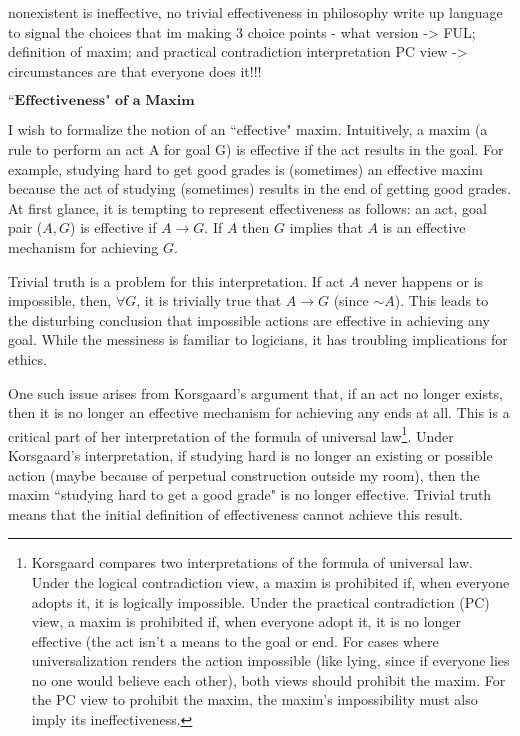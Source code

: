 \begin{isabellebody}
{nonexistent is ineffective, no trivial effectiveness in philosophy
write up language to signal the choices that im making
3 choice points - what version -> FUL; definition of maxim; and practical contradiction interpretation
PC view -> circumstances are that everyone does it!!!%
}%
\pagebreak
%
\begin{isamarkuptext}%
$\textbf{``Effectiveness" of a Maxim}$%
\end{isamarkuptext}\isamarkuptrue%
%
\begin{isamarkuptext}%
I wish to formalize the notion of an ``effective" maxim. Intuitively, a maxim (a rule to 
perform an act A for goal G) is effective if the act results in the goal. For example, studying hard 
to get good grades is (sometimes) an effective maxim because the act of studying (sometimes) results in
 the end of getting good grades. At first glance, it is tempting to represent effectiveness 
as follows: an act, goal pair ($A, G$) is effective if $A \longrightarrow G$. If $A$ then $G$ implies that 
$A$ is an effective mechanism for achieving $G$.

Trivial truth is a problem for this interpretation. If act $A$ never happens or 
is impossible, then, $\forall G$, it is trivially true that $A \longrightarrow G$ (since $\sim A$). This leads to the 
disturbing conclusion that impossible actions are effective in achieving any goal. While the messiness 
is familiar to logicians, it has troubling implications for ethics.

One such issue arises from Korsgaard's \cite{KorsgaardFUL} argument that, if an act no longer exists, then it is no 
longer an effective mechanism for achieving any ends at all. This is a critical part of her interpretation 
of the formula of universal law\footnote{Korsgaard compares two interpretations of the formula of universal law. 
Under the logical contradiction view, a maxim is prohibited if, when everyone adopts it, it is logically
impossible. Under the practical contradiction (PC) view, a maxim is prohibited if, when everyone adopt it, 
it is no longer effective (the act isn't a means to the goal or end. For cases where universalization 
renders the action impossible (like lying, since if everyone lies no one would believe each other), both 
views should prohibit the maxim. For the PC view to prohibit the maxim, the maxim's impossibility must 
also imply its ineffectiveness.}. Under Korsgaard's interpretation, if 
studying hard is no longer an existing or possible action  (maybe because of perpetual construction outside my room), 
then the maxim ``studying hard to get a good grade" is no longer effective. Trivial truth means that the
initial definition of effectiveness cannot achieve this result.


\end{isamarkuptext}
\end{isabellebody}
